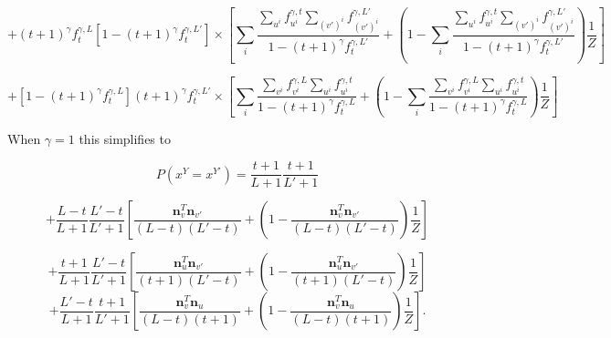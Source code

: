 \documentclass{article}
\begin{document}
\begin{appendices}
$$+(t+1)^\gamma f^{\gamma,L}_t[1-(t+1)^\gamma f^{\gamma,L'}_t] \times 
\left[
\sum_i \frac{\sum\limits_{u^i} f_{u^i}^{\gamma, t} \sum\limits_{(v')^i} f_{(v')^i}^{\gamma,L'}}{1 - (t+1)^\gamma f^{\gamma,L'}_t} 
+ \left(1 - \sum_i \frac{\sum\limits_{u^i} f_{u^i}^{\gamma, t} \sum\limits_{(v')^i} f_{(v')^i}^{\gamma,L'}}{1 - (t+1)^\gamma f^{\gamma,L'}_t}\right)\frac{1}{Z}
\right]
$$

$$+[1 - (t+1)^\gamma f^{\gamma,L}_t](t+1)^\gamma f^{\gamma,L'}_t \times \left[
\sum_i \frac{\sum\limits_{v^i} f_{v^i}^{\gamma,L}\sum\limits_{u^i} f_{u^i}^{\gamma, t}}{1 - (t+1)^\gamma f^{\gamma,L}_t} 
+ \left(1 - \sum_i \frac{\sum\limits_{v^i} f_{v^i}^{\gamma,L}\sum\limits_{u^i} f_{u^i}^{\gamma, t}}{1 - (t+1)^\gamma f^{\gamma,L}_t}\right)\frac{1}{Z}
\right]
$$

When $\gamma = 1$ this simplifies to

$$P(x^Y = x^{Y'}) =  \frac{t+1}{L+1}\frac{t+1}{L'+1}$$

$$
+ \frac{L-t}{L+1}\frac{L'-t}{L'+1}\left[\frac{\mathbf{n}^T_v\mathbf{n}_{v'}}{(L-t)(L'-t)} + \left(1 - \frac{\mathbf{n}^T_v\mathbf{n}_{v'}}{(L-t)(L'-t)} \right)\frac{1}{Z}\right]
$$

$$+\frac{t+1}{L+1}\frac{L'-t}{L'+1}\left[
\frac{\mathbf{n}^T_{u}\mathbf{n}_{v'}}{(t+1)(L'-t)}+ \left(1 - \frac{\mathbf{n}^T_{u}\mathbf{n}_{v'}}{(t+1)(L'-t)} \right)\frac{1}{Z}
\right]$$
$$
+\frac{L'-t}{L+1}\frac{t+1}{L'+1}\left[
\frac{\mathbf{n}^T_{v}\mathbf{n}_{u}}{(L-t)(t+1)} + \left(1 - \frac{\mathbf{n}^T_{v}\mathbf{n}_{u}}{(L-t)(t+1)} \right)\frac{1}{Z}
\right].
$$

\end{appendices}







\end{document}
